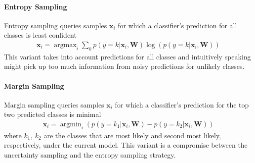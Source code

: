 \documentclass[runningheads,a4paper]{article}
\renewcommand{\vec}[1]{\mathbf{#1}}
\DeclareMathOperator*{\argmax}{argmax}
\DeclareMathOperator*{\argmin}{argmin}
\begin{document}
\paragraph{Entropy Sampling}
Entropy sampling queries samples $\vec{x}_i$ for which a classifier's prediction for all classes is least confident
\begin{align}\label{eq:entropy_sampling}
\vec{x}_i = \argmax_{i} \sum_k p(y=k|\vec{x}_i,\vec{W}) \log(p(y=k|\vec{x}_i,\vec{W}))
\end{align}
This variant takes into account predictions for all classes and intuitively speaking might pick up too much information from noisy predictions for unlikely classes. 

\paragraph{Margin Sampling}
Margin sampling \cite{Scheffer2001} queries samples $\vec{x}_i$ for which a classifier's prediction for the top two predicted classes is minimal
\begin{align}\label{eq:entropy_sampling}
\vec{x}_i = \argmin_{i} \left(p(y=k_1|\vec{x}_i,\vec{W}) - p(y=k_2|\vec{x}_i,\vec{W}) \right)
\end{align}
where $k_1,~k_2$ are the classes that are most likely and second most likely, respectively, under the current model. 
This variant is a compromise between the uncertainty sampling and the entropy sampling strategy.
\end{document}
